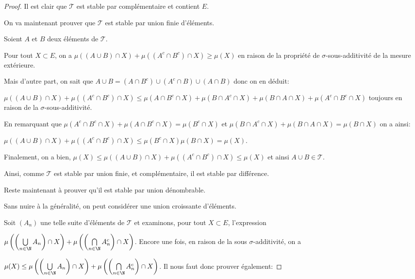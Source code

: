\begin{proof}
Il est clair que $\mathcal{T}$ est stable par complémentaire et contient $E$.

On va maintenant prouver que $\mathcal{T}$ est stable par union finie d'éléments.

Soient $A$ et $B$ deux éléments de $\mathcal{T}$.

Pour tout $X \subset E$, on a $\mu\left((A \cup B) \cap X\right) + \mu\left((A^c \cap B^c) \cap X\right) \geq \mu(X)$ en raison de la propriété de $\sigma$-sous-additivité de la mesure extérieure.

Mais d'autre part, on sait que $A \cup B = \left(A \cap B^c\right) \cup \left(A^c \cap B\right) \cup \left(A \cap B\right)$ donc on en déduit:

$\mu\left((A \cup B) \cap X\right) + \mu\left((A^c \cap B^c) \cap X\right) \leq \mu(A \cap B^c \cap X) + \mu(B \cap A^c \cap X) +  \mu(B \cap A \cap X)+ \mu(A^c \cap B^c \cap X)$ toujours en raison de la $\sigma$-sous-additivité.

En remarquant que $\mu(A^c \cap B^c \cap X) +  \mu(A \cap B^c \cap X) = \mu(B^c \cap X)$ et $\mu(B \cap A^c \cap X)+\mu(B \cap A \cap X) = \mu(B \cap X)$ on a ainsi:

$\mu\left((A \cup B) \cap X\right) + \mu\left((A^c \cap B^c) \cap X\right) \leq \mu(B^c \cap X)
\mu(B \cap X) = \mu(X)$.


Finalement, on a bien, $\mu(X) \leq \mu\left((A \cup B) \cap X\right) + \mu\left((A^c \cap B^c) \cap X\right) \leq \mu(X)$ et ainsi $A \cup B \in \mathcal{T}$.

Ainsi, comme $\mathcal{T}$ est stable par union finie, et complémentaire, il est stable par différence.

Reste maintenant à prouver qu'il est stable par union dénombrable.

Sans nuire à la généralité, on peut considérer une union croissante d'éléments. 


Soit $(A_n)$ une telle suite d'éléments de $\mathcal{T}$ et examinons, pour tout $X \subset E$, l'expression

$\mu\left(\left(\bigcup \limits_{n \in \N} A_n\right) \cap X\right) + \mu\left(\left(\bigcap \limits_{n \in \N} A_n^c\right) \cap X\right)$. 
Encore une fois, en raison de la sous $\sigma$-additivité, on a

$\mu(X) \leq \mu\left(\left(\bigcup \limits_{n \in \N} A_n\right) \cap X\right) + \mu\left(\left(\bigcap \limits_{n \in \N} A_n^c\right) \cap X\right)$. 
Il nous faut donc prouver également:


\end{proof}
